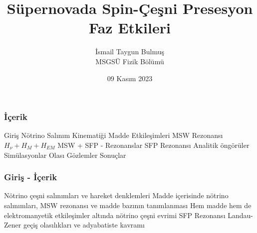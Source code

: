 \documentclass[10pt]{beamer}
\title[Süpernovada Spin-Çeşni Presesyon Faz Etkileri]{\huge \textbf{Süpernovada Spin-Çeşni Presesyon Faz Etkileri}} %
\author{{\Large{İsmail Taygun Bulmuş}}\\MSGSÜ Fizik Bölümü\vspace{1cm}} %
\institute[MSGSÜ, Fizik Bölümü] %
{\vspace{1cm}
{\large \textbf{MSGSÜ Bölüm Semineri}}}
\date{09 Kasım 2023} %
\begin{document}
\shorthandoff{=}

\begin{frame}
\titlepage %
\end{frame}

\begin{frame}
    \frametitle{İçerik}
    \begin{outline}
        \1[\textbullet] Giriş
        \1[\textbullet] Nötrino Salınım Kinematiği
        \1[\textbullet] Madde Etkileşimleri
        \2[\textendash] MSW Rezonansı
        \1[\textbullet] $H_{\nu}+ H_{M}+ H_{EM}$
        \1[\textbullet] MSW + SFP - Rezonanslar
        \2[\textendash] SFP Rezonansı
        \1[\textbullet] Analitik öngörüler
        \1[\textbullet] Simülasyonlar
        \1[\textbullet] Olası Gözlemler
        \1[\textbullet] Sonuçlar
    \end{outline}
\end{frame}

\begin{frame}
    \frametitle{Giriş - İçerik}
    \begin{outline}
        \1[\textbullet] Nötrino çeşni salınımları ve hareket denklemleri
        \1[\textbullet] Madde içerisinde nötrino salınımları, MSW rezonansı ve madde bazının tanımlanması
        \1[\textbullet] Hem madde hem de elektromanyetik etkileşimler altında nötrino çeşni evrimi
        \2[\textendash] SFP Rezonansı
        \1[\textbullet] Landau-Zener geçiş olasılıkları ve adyabatiste kavramı
    \end{outline}
\end{frame}
\end{document}
